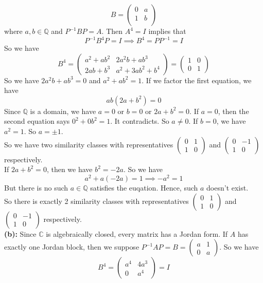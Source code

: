 \documentclass[12pt]{amsart}
\newcommand{\Q}{\mathbb{Q}}
\newcommand{\C}{\mathbb{C}}
\begin{document}
\[B=\begin{pmatrix}
    0&a\\
    1&b\\
\end{pmatrix}\]
where $a,b\in\Q$ and $P^{-1}BP=A$. Then $A^4=I$ implies that 
\[P^{-1}B^4P=I\implies B^4=PP^{-1}=I \]
So we have 
\[B^4=\begin{pmatrix}
    a^2+ab^2&2a^2b+ab^3\\
    2ab+b^3 & a^2+3ab^2+b^4
\end{pmatrix}=\begin{pmatrix}
    1&0\\
    0&1
\end{pmatrix}\]
So we have $2a^2b+ab^3=0$ and $a^2+ab^2=1$. If we factor the first equation, we have 
\[ab(2a+b^2)=0\]
Since $\Q$ is a domain, we have $a=0$ or $b=0$ or $2a+b^2=0$.
If $a=0$, then the second equation says $0^2+0b^2=1$. It contradicts. So $a\neq 0$. If $b=0$, we have $a^2=1$. So $a=\pm1$.\\
So we have two similarity classes with representatives $\begin{pmatrix}
    0&1\\
    1&0
\end{pmatrix}$ and $\begin{pmatrix}
    0&-1\\
    1&0
\end{pmatrix}$ respectively.\\
If $2a+b^2=0$, then we have $b^2=-2a.$ So we have 
\[a^2+a(-2a)=1\implies -a^2=1\]
But there is no such $a\in \Q$ satisfies the euqation. Hence, such $a$ doesn't exist.\\
So there is exactly 2 similarity classes with representatives $\begin{pmatrix}
    0&1\\
    1&0
\end{pmatrix}$ and $\begin{pmatrix}
    0&-1\\
    1&0
\end{pmatrix}$ respectively.
\\\textbf{(b):} Since $\C$ is algebraically closed, every matrix has a Jordan form. If $A$ has exactly one Jordan block, then we suppose $P^{-1}AP=B=\begin{pmatrix}
    a&1\\
    0&a
\end{pmatrix}$. So we have 
\[B^4=\begin{pmatrix}
    a^4&4a^3\\0&a^4
\end{pmatrix} =I\]
\end{document}
